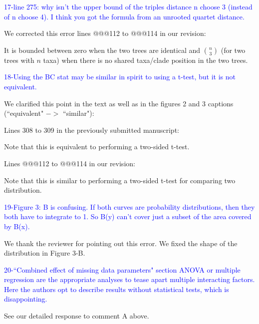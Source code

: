 \documentclass[11pt]{letter}
\begin{document}
\begin{letter}{}

\textcolor{blue}{17-line 275: why isn't the upper bound of the triples distance n choose 3 (instead of n choose 4). I think you got the formula from an unrooted quartet distance.}

We corrected this error lines @@@112 to @@@114 in our revision:

\hfill\begin{minipage}{\dimexpr\textwidth-1cm}
It is bounded between zero when the two trees are identical and $\binom{n}{3}$ (for two trees with $n$ taxa) when there is no shared taxa/clade position in the two trees.
\end{minipage}


\textcolor{blue}{18-Using the BC stat may be similar in spirit to using a t-test, but it is not equivalent.}

We clarified this point in the text as well as in the figures 2 and 3 captions (``equivalent" $->$ ``similar"):

Lines 308 to 309 in the previously submitted manuscript:

\hfill\begin{minipage}{\dimexpr\textwidth-1cm}
Note that this is equivalent to performing a two-sided t-test.
\end{minipage}

Lines @@@112 to @@@114 in our revision:

\hfill\begin{minipage}{\dimexpr\textwidth-1cm}
Note that this is similar to performing a two-sided t-test for comparing two distribution.
\end{minipage}


\textcolor{blue}{19-Figure 3: B is confusing. If both curves are probability distributions, then they both have to integrate to 1. So B(y) can't cover just a subset of the area covered by B(x).}

We thank the reviewer for pointing out this error. We fixed the shape of the distribution in Figure 3-B.


\textcolor{blue}{20-``Combined effect of missing data parameters" section ANOVA or multiple regression are the appropriate analyses to tease apart multiple interacting factors. Here the authors opt to describe results without statistical tests, which is disappointing.}

See our detailed response to comment A above.


\end{letter}
\end{document}
